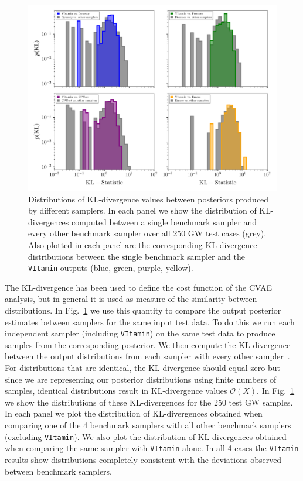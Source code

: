 \documentclass[%
showpacs,
nofootinbib,
 amsmath,amssymb,
 aps,
 twocolumn,
 prl,
 reprint,
floatfix,
]{revtex4-1}
\begin{document}
%
\begin{figure}
    \includegraphics[width=\textwidth]{hist-kl.png}
    \caption{\label{fig:kl_results} Distributions of \ac{KL}-divergence values
between posteriors produced by different samplers. In each panel we show the
distribution of \ac{KL}-divergences computed between a single benchmark sampler
and every other benchmark sampler over all 250 \ac{GW} test cases (grey). Also
plotted in each panel are the corresponding \ac{KL}-divergence distributions
between the single benchmark sampler and the \texttt{VItamin} outputs (blue,
green, purple, yellow).}

\end{figure}
%

%
%
The \ac{KL}-divergence has been used to define the cost function of the
\ac{CVAE} analysis, but in general it is used as measure of the similarity
between distributions. In Fig.~\ref{fig:kl_results} we use this quantity to
compare the output posterior estimates between samplers for the same input test
data. To do this we run each independent sampler (including \texttt{VItamin})
on the same test data to produce samples from the corresponding posterior. We
then compute the \ac{KL}-divergence between the output distributions from each
sampler with every other sampler~\cite{4839047}.  For distributions that are
identical, the \ac{KL}-divergence {should} equal zero but since we are
representing our posterior distributions using finite numbers of samples,
identical distributions result in \ac{KL}-divergence values $\mathcal{O}(X)$.
In Fig.~\ref{fig:kl_results} we show the distributions of these
\ac{KL}-divergences for the 250 test \ac{GW} samples. In each panel we plot the
distribution of \ac{KL}-divergences obtained when comparing one of the 4
benchmark samplers with all other benchmark samplers (excluding
\texttt{VItamin}). We also plot the distribution of \ac{KL}-divergences
obtained when comparing the same sampler with \texttt{VItamin} alone. In all 4
cases the \texttt{VItamin} results show distributions completely consistent
with the deviations observed between benchmark samplers.  


\end{document}
